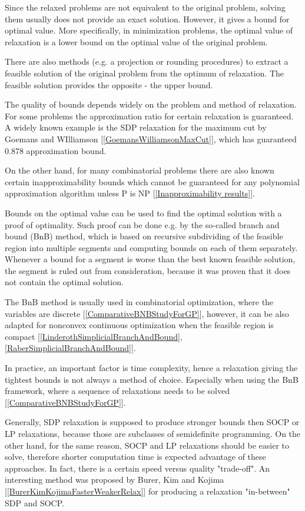 \documentclass[12pt]{book}
\theoremstyle{definition}
\begin{document}
Since the relaxed problems are not equivalent to the original problem, solving them usually does not provide an exact solution. However, it gives a bound for optimal value. More specifically, in minimization problems, the optimal value of relaxation is a lower bound on the optimal value of the original problem. 

There are also methods (e.g. a projection or rounding procedures) to extract a feasible solution of the original problem from the optimum of relaxation. The feasible solution provides the opposite - the upper bound.


The quality of bounds depends widely on the problem and method of relaxation. For some problems the approximation ratio for certain relaxation is guaranteed. A widely known example is the SDP relaxation for the maximum cut by Goemans and WIlliamson [\ref{GoemansWilliamsonMaxCut}], which has guaranteed 0.878 approximation bound.

On the other hand, for many combinatorial problems there are also known certain inapproximability bounds which cannot be guaranteed for any polynomial approximation algorithm unless P is NP [\ref{Inapproximability results}]. 


Bounds on the optimal value can be used to find the optimal solution with a proof of optimality. Such proof can be done e.g. by the so-called branch and bound (BnB) method, which is based on recursive subdividing of the feasible region into multiple segments and computing bounds on each of them separately. Whenever a bound for a segment is worse than the best known feasible solution, the segment is ruled out from consideration, because it was proven that it does not contain the optimal solution. 

The BnB method is usually used in combinatorial optimization, where the variables are discrete [\ref{ComparativeBNBStudyForGP}], however, it can be also adapted for nonconvex continuous optimization when the feasible region is compact [\ref{LinderothSimplicialBranchAndBound}, \ref{RaberSimplicialBranchAndBound}].

In practice, an important factor is time complexity, hence a relaxation giving the tightest bounds is not always a method of choice. Especially when using the BnB framework, where a sequence of relaxations needs to be solved [\ref{ComparativeBNBStudyForGP}].

Generally, SDP relaxation is supposed to produce stronger bounds then SOCP or LP relaxations, because those are subclasses of semidefinite programming. On the other hand, for the same reason, SOCP and LP relaxations should be easier to solve, therefore shorter computation time is expected advantage of these approaches. In fact, there is a certain speed versus quality "trade-off". 
An interesting method was proposed by Burer, Kim and Kojima [\ref{BurerKimKojimaFasterWeakerRelax}] for producing a relaxation "in-between" SDP and SOCP. 
\end{document}

